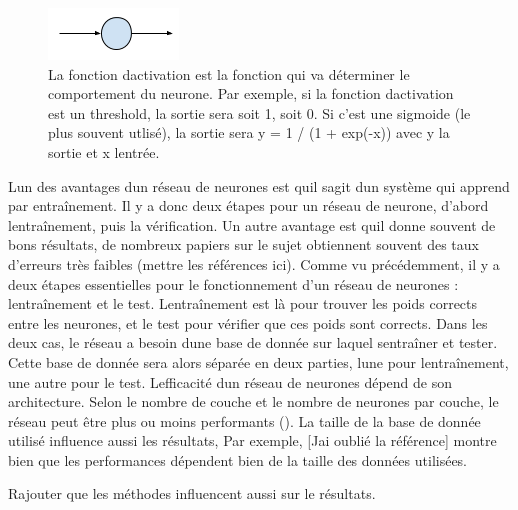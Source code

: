 \documentclass[11pt]{sdm}
\begin{document}
		\bigbreak

		\begin{figure}[!ht]
			\centering
			\includegraphics[natwidth=131,natheight=52]{figure3.png}
			\caption{La fonction d\textquotesingle activation est la fonction qui va d\'eterminer le comportement du neurone. Par exemple, si la fonction d\textquotesingle activation est un threshold, la sortie sera soit 1, soit 0. Si c’est une sigmoide (le plus souvent utlis\'e), la sortie sera y = 1 / (1 + exp(-x)) avec y la sortie et x l\textquotesingle entr\'ee.}
			\label{fig:neural}
		\end{figure}
	
		\bigbreak
		\bigbreak

		L\textquotesingle un des avantages d\textquotesingle un r\'eseau de neurones est qu\textquotesingle il s\textquotesingle agit d\textquotesingle un syst\`eme qui apprend par entra\^inement. Il y a donc deux \'etapes pour un r\'eseau de neurone, d’abord l\textquotesingle entra\^inement, puis la v\'erification. Un autre avantage est qu\textquotesingle il donne souvent de bons r\'esultats, de nombreux papiers sur le sujet obtiennent souvent des taux d’erreurs tr\`es faibles (mettre les r\'ef\'erences ici).
		Comme vu pr\'ec\'edemment, il y a deux \'etapes essentielles pour le fonctionnement d’un r\'eseau de neurones : l\textquotesingle entra\^inement et le test. L\textquotesingle entra\^inement est l\`a pour trouver les poids corrects entre les neurones, et le test pour v\'erifier que ces poids sont corrects. Dans les deux cas, le r\'eseau a besoin d\textquotesingle une base de donn\'ee sur laquel s\textquotesingle entra\^iner et tester. Cette base de donn\'ee sera alors s\'epar\'ee en deux parties, l\textquotesingle une pour l\textquotesingle entra\^inement, une autre pour le test.
		L\textquotesingle efficacit\'e d\textquotesingle un r\'eseau de neurones d\'epend de son architecture. Selon le nombre de couche et le nombre de neurones par couche, le r\'eseau peut \^etre plus ou moins performants (\cite{chatfield2014return}\cite{srivastava2014dropout}). La taille de la base de donn\'ee utilis\'e influence aussi les r\'esultats, Par exemple, [J\textquotesingle ai oubli\'e la r\'ef\'erence] montre bien que les performances d\'ependent bien de la taille des donn\'ees utilis\'ees. \begin{itshape} Rajouter que les m\'ethodes influencent aussi sur le r\'esultats. \end{itshape}
\end{document}
